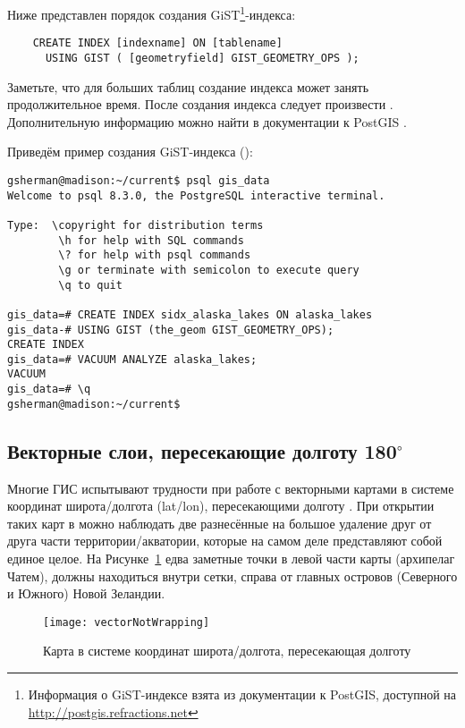 Ниже представлен порядок создания GiST\footnote{Информация о GiST-индексе
взята из документации к PostGIS, доступной на
\url{http://postgis.refractions.net}}-индекса:

\begin{verbatim}
    CREATE INDEX [indexname] ON [tablename]
      USING GIST ( [geometryfield] GIST_GEOMETRY_OPS );
\end{verbatim}

Заметьте, что для больших таблиц создание индекса может занять
продолжительное время. После создания индекса следует произвести
. Дополнительную информацию можно найти в
документации к PostGIS \cite{PostGISweb}.

Приведём пример создания GiST-индекса (\nix):
\begin{verbatim}
gsherman@madison:~/current$ psql gis_data
Welcome to psql 8.3.0, the PostgreSQL interactive terminal.

Type:  \copyright for distribution terms
        \h for help with SQL commands
        \? for help with psql commands
        \g or terminate with semicolon to execute query
        \q to quit

gis_data=# CREATE INDEX sidx_alaska_lakes ON alaska_lakes
gis_data-# USING GIST (the_geom GIST_GEOMETRY_OPS);
CREATE INDEX
gis_data=# VACUUM ANALYZE alaska_lakes;
VACUUM
gis_data=# \q
gsherman@madison:~/current$
\end{verbatim}

\subsection{Векторные слои, пересекающие долготу 180$^\circ$}

Многие ГИС испытывают трудности при работе с векторными картами в системе
координат широта/долгота (lat/lon), пересекающими долготу .
При открытии таких карт в \qg можно наблюдать две разнесённые на большое
удаление друг от друга части территории/акватории, которые на самом деле
представляют собой единое целое. На Рисунке~\ref{fig:vector_not_wrapping}
едва заметные точки в левой части карты (архипелаг Чатем), должны
находиться внутри сетки, справа от главных островов (Северного и Южного)
Новой Зеландии.

\begin{figure}[ht]
   \centering
   \texttt{[image: vectorNotWrapping]}
      \caption{Карта в системе координат широта/долгота, пересекающая долготу  \wincaption}
   \label{fig:vector_not_wrapping}
\end{figure}

